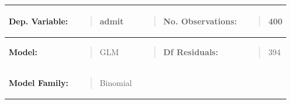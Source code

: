 {\def\LTcaptype{none} %
\begin{longtable}[]{@{}
  >{\raggedright\arraybackslash}p{}
  >{\raggedright\arraybackslash}p{}
  >{\raggedright\arraybackslash}p{}
  >{\raggedright\arraybackslash}p{}@{}}
\toprule\noalign{}
\begin{minipage}[b]{\linewidth}\raggedright
\textbf{Dep. Variable:}
\end{minipage} & \begin{minipage}[b]{\linewidth}\raggedright
\begin{quote}
admit
\end{quote}
\end{minipage} & \begin{minipage}[b]{\linewidth}\raggedright
\begin{quote}
\textbf{No. Observations:}
\end{quote}
\end{minipage} & \begin{minipage}[b]{\linewidth}\raggedright
\begin{quote}
400
\end{quote}
\end{minipage} \\
\midrule\noalign{}
\endhead
\bottomrule\noalign{}
\endlastfoot
\textbf{Model:} & \begin{minipage}[t]{\linewidth}\raggedright
\begin{quote}
GLM
\end{quote}
\end{minipage} & \begin{minipage}[t]{\linewidth}\raggedright
\begin{quote}
\textbf{Df Residuals:}
\end{quote}
\end{minipage} & \begin{minipage}[t]{\linewidth}\raggedright
\begin{quote}
394
\end{quote}
\end{minipage} \\
\textbf{Model Family:} & \begin{minipage}[t]{\linewidth}\raggedright
\begin{quote}
Binomial
\end{quote}
\end{minipage} & \begin{minipage}[t]{\linewidth}\raggedright

\end{minipage}
\end{longtable}}

